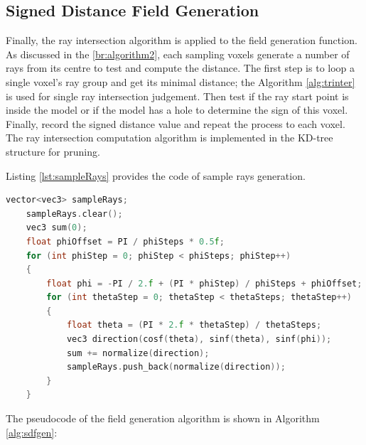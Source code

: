\subsection{Signed Distance Field Generation}

Finally, the ray intersection algorithm is applied to the field generation function. As discussed in the \ref{br:algorithm2}, each sampling voxels generate a number of rays from its centre to test and compute the distance. The first step is to loop a single voxel's ray group and get its minimal distance; the Algorithm \ref{alg:trinter} is used for single ray intersection judgement. Then test if the ray start point is inside the model or if the model has a hole to determine the sign of this voxel. Finally, record the signed distance value and repeat the process to each voxel. The ray intersection computation algorithm is implemented in the KD-tree structure for pruning.

\hspace*{\fill}

Listing \ref{lst:sampleRays} provides the code of sample rays generation.

\begin{lstlisting}[language=C++, label={lst:sampleRays}, caption = Function of generating sample rays for voxels]
    vector<vec3> sampleRays;
    sampleRays.clear();
    vec3 sum(0);
    float phiOffset = PI / phiSteps * 0.5f;
    for (int phiStep = 0; phiStep < phiSteps; phiStep++)
    {
        float phi = -PI / 2.f + (PI * phiStep) / phiSteps + phiOffset;
        for (int thetaStep = 0; thetaStep < thetaSteps; thetaStep++)
        {
            float theta = (PI * 2.f * thetaStep) / thetaSteps;
            vec3 direction(cosf(theta), sinf(theta), sinf(phi));
            sum += normalize(direction);
            sampleRays.push_back(normalize(direction));
        }
    }
\end{lstlisting}

The pseudocode of the field generation algorithm is shown in Algorithm \ref{alg:sdfgen}:

